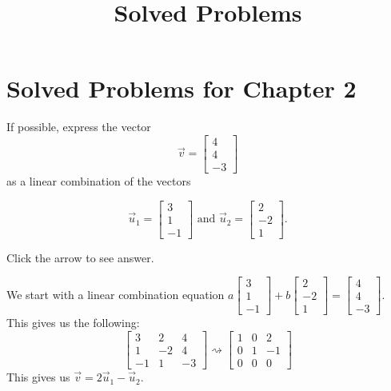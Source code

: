 \documentclass{ximera}
\title{Solved Problems} \license{CC BY-NC-SA 4.0}
\begin{document}
\begin{abstract}
\end{abstract}
\maketitle

\section*{Solved Problems for Chapter 2}

\begin{problem}\label{prb:3.3}
If possible, express the vector
\begin{equation*}
\vec{v}= 
\begin{bmatrix}
4 \\
4 \\
-3
\end{bmatrix}
\end{equation*}
as a linear combination of the vectors

\begin{equation*}
\vec{u}_1 = 
\begin{bmatrix}
3 \\
1 \\
-1
\end{bmatrix}
\mbox{ and  }
\vec{u}_2 =
\begin{bmatrix}
2 \\
-2\\
1
\end{bmatrix}.
\end{equation*}

Click the arrow to see answer.
\begin{expandable}
    We start with a linear combination equation $a\begin{bmatrix}3\\1\\-1\end{bmatrix}+b\begin{bmatrix}2\\-2\\1\end{bmatrix}=\begin{bmatrix}4\\4\\-3\end{bmatrix}$.  This gives us the following:
    $$\left[
\begin{array}{rr|r}
3 & 2 & 4 \\
1 & -2 & 4\\
-1 & 1 & -3
\end{array}
\right] \rightsquigarrow \left[
\begin{array}{rr|r}1& 0& 2\\
 0& 1 &-1\\
 0& 0& 0\end{array}
\right]$$
This gives us $\vec{v}=2\vec{u}_1 -\vec{u}_2$.
\end{expandable}
\end{problem}
\end{document}
